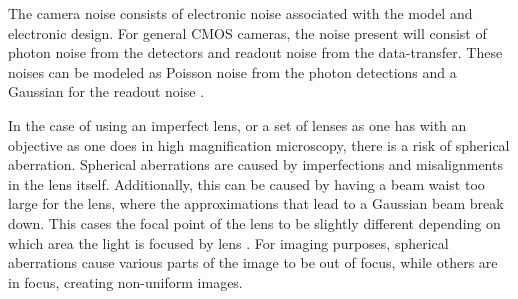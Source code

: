 The camera noise consists of electronic noise associated with the model and electronic design. For general CMOS cameras, the noise present will consist of photon noise from the detectors and readout noise from the data-transfer. These noises can be modeled as Poisson noise from the photon detections and a Gaussian for the readout noise \cite{holst2007cmos}. 

In the case of using an imperfect lens, or a set of lenses as one has with an objective as one does in high magnification microscopy, there is a risk of spherical aberration. Spherical aberrations are caused by imperfections and misalignments in the lens itself. Additionally, this can be caused by having a beam waist too large for the lens, where the approximations that lead to a Gaussian beam break down. This cases the focal point of the lens to be slightly different depending on which area the light is focused by lens \cite{hecht2017optics}. For imaging purposes, spherical aberrations cause various parts of the image to be out of focus, while others are in focus, creating non-uniform images.









